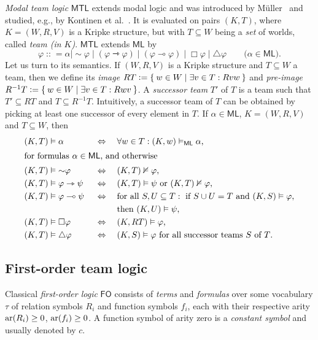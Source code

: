 \documentclass[a4paper,english,fleqn,11pt,final]{scrartcl}
\makeatletter
\newcommand{\eg}{e.g.\@\xspace}
\newcommand{\mathCommandFont}[1]{\mathrm{#1}}
\newcommand{\arity}[1]{{\protect\ensuremath{\mathCommandFont{ar}(#1)}}}
\newcommand{\negg}{{\sim}}
\newcommand{\logic}[1]{\ensuremath{\mathsf{#1}}\xspace}
\newcommand{\ML}{\logic{ML}}
\newcommand{\FO}{\logic{FO}}
\newcommand{\MTL}{\logic{MTL}}
\providecommand{\dfn}{\mathrel{\mathop:}=}
\providecommand{\ddfn}{\mathrel{\mathop{{\mathop:}{\mathop:}}}=}
\newcommand{\limp}{\multimap}
\newcommand{\timp}{\rightarrowtriangle}
\theoremstyle{plain}
\theoremstyle{definition}
\makeatother
\begin{document}
\emph{Modal team logic} $\MTL$ extends modal logic and was introduced by Müller~\cite{mtlthesis} and studied, \eg, by Kontinen et al.\ \cite{kontinen_van_2014}.
It is evaluated on pairs $(K,T)$, where $K = (W,R,V)$ is a Kripke structure, but with $T \subseteq W$ being a \emph{set} of worlds, called \emph{team (in $K$)}.
$\MTL$ extends $\ML$ by
\[
\varphi \ddfn \alpha \mid \negg \varphi \mid (\varphi \timp \varphi) \mid (\varphi \limp \varphi) \mid \Box \varphi \mid \triangle \varphi\qquad \text{($\alpha \in \ML$).}
\]
Let us turn to its semantics.
If $(W,R,V)$ is a Kripke structure and $T \subseteq W$ a team, then we define its \emph{image} $RT \dfn \Set{ w \in W | \exists v \in T : Rvw }$ and \emph{pre-image} $R^{-1}T\dfn\Set{ w \in W | \exists v \in T : Rwv }$.
A \emph{successor team} $T'$ of $T$ is a team such that $T' \subseteq RT$ and $T \subseteq R^{-1}T$.
Intuitively, a successor team of $T$ can be obtained by picking at least one successor of every element in $T$.
If $\alpha \in \ML$, $K = (W,R,V)$ and $T \subseteq W$, then
\begin{alignat*}{3}
    &(K,T) \vDash \alpha&& \Leftrightarrow\; &&\forall w \in T : (K,w) \vDash_{\ML} \alpha\text{,}\\
\intertext{for formulas $\alpha \in \ML$, and otherwise}
    &(K,T) \vDash \negg\varphi&&\Leftrightarrow &&(K,T) \nvDash \varphi\text{,}\\
    &(K,T) \vDash \varphi \timp \psi&&\Leftrightarrow &&(K,T) \vDash \psi \text{ or }(K,T)\nvDash \varphi\text{,}\\
    &(K,T) \vDash \varphi \limp \psi\;&&\Leftrightarrow &&\text{for all } S, U \subseteq T : \text{ if }S \cup U = T \text{ and }(K,S) \vDash \varphi \text{,}\\
    & && && \text{then }(K,U) \vDash \psi\text{,}\\
    &(K,T) \vDash \Box \varphi &&\Leftrightarrow &&(K,RT) \vDash \varphi \text{,}\\
    &(K,T) \vDash \triangle \varphi &&\Leftrightarrow && (K,S) \vDash \varphi \text{ for all successor teams }S\text{ of }T\text{.}
\end{alignat*}




\subsection{First-order team logic}

Classical \emph{first-order logic} $\FO$ consists of \emph{terms} and \emph{formulas} over some vocabulary $\tau$
of relation symbols $R_i$ and function symbols $f_i$, each with their respective arity $\arity{R_i} \geq 0$, $\arity{f_i}\geq 0$.
A function symbol of arity zero is a \emph{constant symbol} and usually denoted by $c$.
\end{document}
